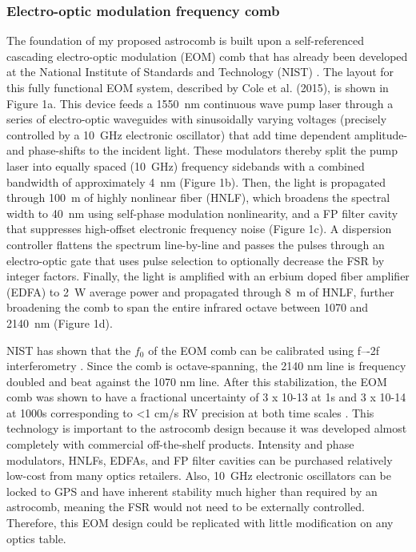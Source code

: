 \documentclass[11pt]{article}
\begin{document}
\subsubsection{Electro-optic modulation frequency comb}

The foundation of my proposed astrocomb is built upon a self-referenced cascading electro-optic modulation (EOM) comb that has already been developed at the National Institute of Standards and Technology (NIST) \cite{Cole2015, Beha2017, Carlson2017}. The layout for this fully functional EOM system, described by Cole et al. (2015), is shown in Figure 1a. This device feeds a \SI{1550}{\nano\meter} continuous wave pump laser through a series of electro-optic waveguides with sinusoidally varying voltages (precisely controlled by a \SI{10}{\giga\hertz} electronic oscillator) that add time dependent amplitude- and phase-shifts to the incident light. These modulators thereby split the pump laser into equally spaced (\SI{10}{\giga\hertz}) frequency sidebands with a combined bandwidth of approximately \SI{4}{\nano\meter} (Figure 1b). Then, the light is propagated through \SI{100}{\meter} of highly nonlinear fiber (HNLF), which broadens the spectral width to \SI{40}{\nano\meter} using self-phase modulation nonlinearity, and a FP filter cavity that suppresses high-offset electronic frequency noise (Figure 1c). A dispersion controller flattens the spectrum line-by-line and passes the pulses through an electro-optic gate that uses pulse selection to optionally decrease the FSR by integer factors. Finally, the light is amplified with an erbium doped fiber amplifier (EDFA) to \SI{2}{\watt} average power and propagated through \SI{8}{\meter} of HNLF, further broadening the comb to span the entire infrared octave between 1070 and \SI{2140}{\nano\meter} (Figure 1d).

NIST has shown that the $f_0$ of the EOM comb can be calibrated using f–-2f interferometry \cite{Beha2017}. Since the comb is octave-spanning, the 2140 nm line is frequency doubled and beat against the 1070 nm line. After this stabilization, the EOM comb was shown to have a fractional uncertainty of 3 x 10-13 at 1s and 3 x 10-14 at 1000s corresponding to <1 cm/s RV precision at both time scales \cite{Beha2017}. This technology is important to the astrocomb design because it was developed almost completely with commercial off-the-shelf products. Intensity and phase modulators, HNLFs, EDFAs, and FP filter cavities can be purchased relatively low-cost from many optics retailers. Also, \SI{10}{\giga\hertz} electronic oscillators can be locked to GPS and have inherent stability much higher than required by an astrocomb, meaning the FSR would not need to be externally controlled. Therefore, this EOM design could be replicated with little modification on any optics table.
\end{document}
